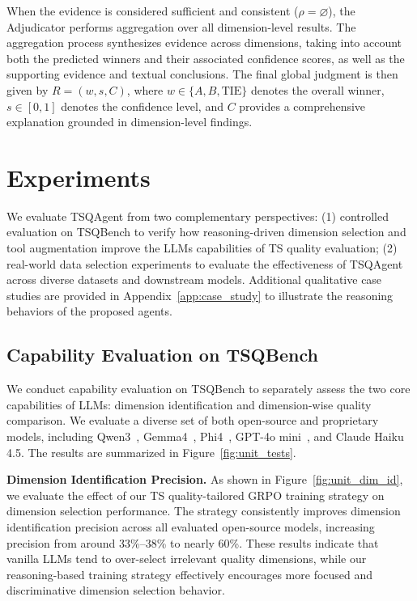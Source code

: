 \documentclass{article}
\newcommand{\partitle}[1]{\smallskip \noindent \textbf{#1.}}
\begin{document}
When the evidence is considered sufficient and consistent ($\rho = \varnothing$), the Adjudicator performs aggregation over all dimension-level results. The aggregation process synthesizes evidence across dimensions, taking into account both the predicted winners and their associated confidence scores, as well as the supporting evidence and textual conclusions. The final global judgment is then given by $R = (w, s, C)$, where $w \in \{A, B, \text{TIE}\}$ denotes the overall winner, $s \in [0,1]$ denotes the confidence level, and $C$ provides a comprehensive explanation grounded in dimension-level findings.


\section{Experiments}
\label{sec:exp}


We evaluate TSQAgent from two complementary perspectives:
(1) controlled evaluation on TSQBench to verify how reasoning-driven dimension selection and tool augmentation improve the LLMs capabilities of TS quality evaluation;
(2) real-world data selection experiments to evaluate the effectiveness of TSQAgent across diverse datasets and downstream models. 
Additional qualitative case studies are provided in Appendix~\ref{app:case_study} to illustrate the reasoning behaviors of the proposed agents.

\subsection{Capability Evaluation on TSQBench}

We conduct capability evaluation on TSQBench to separately assess the two core capabilities of LLMs: dimension identification and dimension-wise quality comparison. We evaluate a diverse set of both open-source and proprietary models, including Qwen3~\citep{yang2025qwen3}, Gemma4~\citep{Kamath2025Gemma3T}, Phi4~\citep{abdin2024phi}, GPT-4o mini~\citep{achiam2023gpt}, and Claude Haiku 4.5. The results are summarized in Figure~\ref{fig:unit_tests}.

\partitle{Dimension Identification Precision}
As shown in Figure~\ref{fig:unit_dim_id}, we evaluate the effect of our TS quality-tailored GRPO training strategy on dimension selection performance. The strategy consistently improves dimension identification precision across all evaluated open-source models, increasing precision from around 33\%--38\% to nearly 60\%. These results indicate that vanilla LLMs tend to over-select irrelevant quality dimensions, while our reasoning-based training strategy effectively encourages more focused and discriminative dimension selection behavior.
\end{document}
